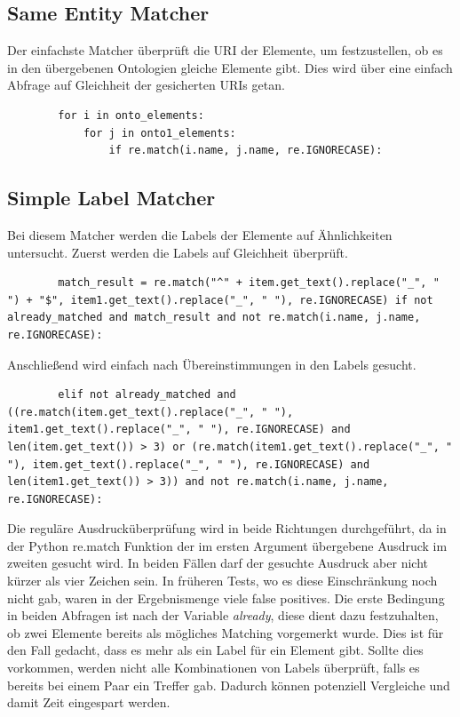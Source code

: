 		\subsection{Same Entity Matcher}
		Der einfachste Matcher überprüft die URI der Elemente, um festzustellen, ob es
		in den übergebenen Ontologien gleiche Elemente gibt. Dies wird über eine
		einfach Abfrage auf Gleichheit der gesicherten URIs getan.
		\begin{lstlisting}
		for i in onto_elements:
			for j in onto1_elements:
				if re.match(i.name, j.name, re.IGNORECASE):
		\end{lstlisting}
		
		\subsection{Simple Label Matcher}
		Bei diesem Matcher werden die Labels der Elemente auf Ähnlichkeiten
		untersucht.
		Zuerst werden die Labels auf Gleichheit überprüft.
		\begin{lstlisting}
		match_result = re.match("^" + item.get_text().replace("_", " ") + "$", item1.get_text().replace("_", " "), re.IGNORECASE) if not already_matched and match_result and not re.match(i.name, j.name, re.IGNORECASE):
		\end{lstlisting}
		Anschließend wird einfach nach Übereinstimmungen in den Labels gesucht.
		\begin{lstlisting}
		elif not already_matched and ((re.match(item.get_text().replace("_", " "), item1.get_text().replace("_", " "), re.IGNORECASE) and len(item.get_text()) > 3) or (re.match(item1.get_text().replace("_", " "), item.get_text().replace("_", " "), re.IGNORECASE) and len(item1.get_text()) > 3)) and not re.match(i.name, j.name, re.IGNORECASE):
		\end{lstlisting}
		Die reguläre Ausdrucküberprüfung wird in beide Richtungen durchgeführt, da in
		der Python re.match Funktion der im ersten Argument übergebene Ausdruck im
		zweiten gesucht wird. In beiden Fällen darf der gesuchte Ausdruck aber nicht
		kürzer als vier Zeichen sein. In früheren Tests, wo es diese Einschränkung
		noch nicht gab, waren in der Ergebnismenge viele false positives.
		Die erste Bedingung in beiden Abfragen ist nach der Variable
		\textit{already\textunderscorematched}, diese dient dazu festzuhalten, ob zwei Elemente
		bereits als mögliches Matching vorgemerkt wurde. Dies ist für den Fall
		gedacht, dass es mehr als ein Label für ein Element gibt. Sollte dies
		vorkommen, werden nicht alle Kombinationen von Labels überprüft, falls es
		bereits bei einem Paar ein Treffer gab. Dadurch können potenziell Vergleiche
		und damit Zeit eingespart werden.
		
